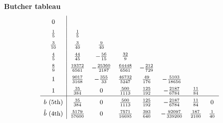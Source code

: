 \documentclass[border=6pt]{standalone}
\begin{document}
\begin{minipage}{4.6in}
\textbf{Butcher tableau}
\[
\renewcommand{\arraystretch}{1.5}
\small
\begin{array}{c|ccccccc}
  0 \\
  \frac{1}{5}  & \frac{1}{5} \\
  \frac{3}{10} & \frac{3}{40} & \frac{9}{40} \\
  \frac{4}{5}  & \frac{44}{45} & -\frac{56}{15} & \frac{32}{9} \\
  \frac{8}{9}  & \frac{19372}{6561} & -\frac{25360}{2187} & \frac{64448}{6561} & -\frac{212}{729} \\
  1            & \frac{9017}{3168} & -\frac{355}{33} & \frac{46732}{5247} & \frac{49}{176} & -\frac{5103}{18656} \\
  1            & \frac{35}{384} & 0 & \frac{500}{1113} & \frac{125}{192} & -\frac{2187}{6784} & \frac{11}{84} \\
  \hline
  b \text{ (5th)} & \frac{35}{384} & 0 & \frac{500}{1113} & \frac{125}{192} & -\frac{2187}{6784} & \frac{11}{84} & 0 \\
  \hat b \text{ (4th)} & \frac{5179}{57600} & 0 & \frac{7571}{16695} & \frac{393}{640} & -\frac{92097}{339200} & \frac{187}{2100} & \frac{1}{40}
\end{array}
\]
\end{minipage}
\end{document}
